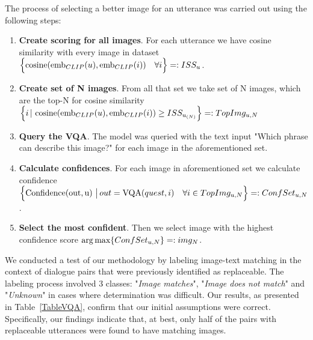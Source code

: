 \smallskip

The process of selecting a better image for an utterance was carried out using the following steps:
\begin{enumerate}
    \item \textbf{Create scoring for all images}. For each utterance we have cosine similarity with every image in dataset $ \Bigl\{ \operatorname{cosine}(\operatorname{emb}_{CLIP}(u), \operatorname{emb}_{CLIP}(i)) \quad \forall i \Bigr\}   =: ISS_u$.
    
    \item \textbf{Create set of N images}. From all that set we take set of N images, which are the top-N for cosine similarity $\Bigl\{i \, | \, \operatorname{cosine}(\operatorname{emb}_{CLIP}(u), \operatorname{emb}_{CLIP}(i)) \geq ISS_{u_{(N)}} \Bigr\} =: TopImg_{u, N}$

    
    \item \textbf{Query the VQA}. The model was queried with the text input "Which phrase can describe this image?" for each image in the aforementioned set.
    


    
    \item \textbf{Calculate confidences}. For each image in aforementioned set we calculate confidence $\Bigl\{ \operatorname{Confidence(out, u)} \, \big| \, out = \operatorname{VQA}(quest, i) \quad \forall i \in TopImg_{u,N}\Bigr\} =: ConfSet_{u,N} $.

    
    \item \textbf{Select the most confident}. Then we select image with the highest confidence score $\displaystyle\operatorname*{arg\,max} \{ConfSet_{u,N}\} =: img_{N}$.
\end{enumerate}

\smallskip

We conducted a test of our methodology by labeling image-text matching in the context of dialogue pairs that were previously identified as replaceable. The labeling process involved 3 classes: "\textit{Image matches}", "\textit{Image does not match}" and "\textit{Unknown}" in cases where determination was difficult. Our results, as presented in Table~\ref{TableVQA}, confirm that our initial assumptions were correct. Specifically, our findings indicate that, at best, only half of the pairs with replaceable utterances were found to have matching images.





